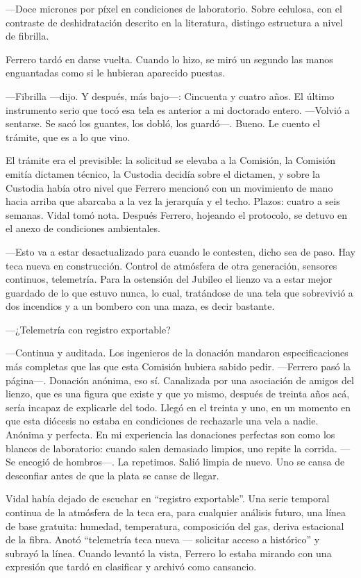 ---Doce micrones por píxel en condiciones de laboratorio. Sobre celulosa, con el contraste de deshidratación descrito en la literatura, distingo estructura a nivel de fibrilla.

Ferrero tardó en darse vuelta. Cuando lo hizo, se miró un segundo las manos enguantadas como si le hubieran aparecido puestas.

---Fibrilla ---dijo. Y después, más bajo---: Cincuenta y cuatro años. El último instrumento serio que tocó esa tela es anterior a mi doctorado entero. ---Volvió a sentarse. Se sacó los guantes, los dobló, los guardó---. Bueno. Le cuento el trámite, que es a lo que vino.

El trámite era el previsible: la solicitud se elevaba a la Comisión, la Comisión emitía dictamen técnico, la Custodia decidía sobre el dictamen, y sobre la Custodia había otro nivel que Ferrero mencionó con un movimiento de mano hacia arriba que abarcaba a la vez la jerarquía y el techo. Plazos: cuatro a seis semanas. Vidal tomó nota. Después Ferrero, hojeando el protocolo, se detuvo en el anexo de condiciones ambientales.

---Esto va a estar desactualizado para cuando le contesten, dicho sea de paso. Hay teca nueva en construcción. Control de atmósfera de otra generación, sensores continuos, telemetría. Para la ostensión del Jubileo el lienzo va a estar mejor guardado de lo que estuvo nunca, lo cual, tratándose de una tela que sobrevivió a dos incendios y a un bombero con una maza, es decir bastante.

---¿Telemetría con registro exportable?

---Continua y auditada. Los ingenieros de la donación mandaron especificaciones más completas que las que esta Comisión hubiera sabido pedir. ---Ferrero pasó la página---. Donación anónima, eso sí. Canalizada por una asociación de amigos del lienzo, que es una figura que existe y que yo mismo, después de treinta años acá, sería incapaz de explicarle del todo. Llegó en el treinta y uno, en un momento en que esta diócesis no estaba en condiciones de rechazarle una vela a nadie. Anónima y perfecta. En mi experiencia las donaciones perfectas son como los blancos de laboratorio: cuando salen demasiado limpios, uno repite la corrida. ---Se encogió de hombros---. La repetimos. Salió limpia de nuevo. Uno se cansa de desconfiar antes de que la plata se canse de llegar.

Vidal había dejado de escuchar en ``registro exportable''. Una serie temporal continua de la atmósfera de la teca era, para cualquier análisis futuro, una línea de base gratuita: humedad, temperatura, composición del gas, deriva estacional de la fibra. Anotó ``telemetría teca nueva --- solicitar acceso a histórico'' y subrayó la línea. Cuando levantó la vista, Ferrero lo estaba mirando con una expresión que tardó en clasificar y archivó como cansancio.

